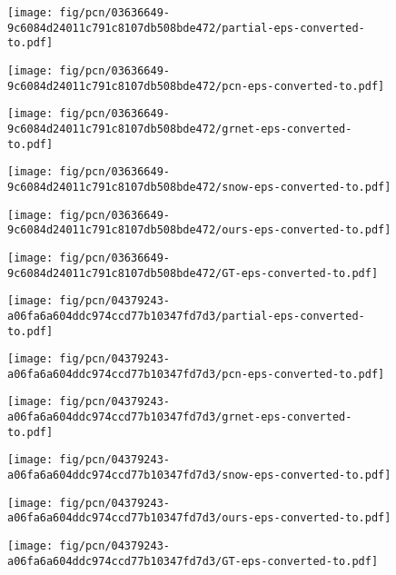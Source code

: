 \begin{figure*}[t]
	\begin{subfigure}{\sunit}
		\centering
		\texttt{[image: fig/pcn/03636649-9c6084d24011c791c8107db508bde472/partial-eps-converted-to.pdf]}
	\end{subfigure}\hfill \begin{subfigure}{\sunit}
		\centering
		\texttt{[image: fig/pcn/03636649-9c6084d24011c791c8107db508bde472/pcn-eps-converted-to.pdf]}
	\end{subfigure}\hfill \begin{subfigure}{\sunit}
		\centering
		\texttt{[image: fig/pcn/03636649-9c6084d24011c791c8107db508bde472/grnet-eps-converted-to.pdf]}
	\end{subfigure}\hfill \begin{subfigure}{\sunit}
		\centering
		\texttt{[image: fig/pcn/03636649-9c6084d24011c791c8107db508bde472/snow-eps-converted-to.pdf]}
	\end{subfigure}\hfill \begin{subfigure}{\sunit}
		\centering
		\texttt{[image: fig/pcn/03636649-9c6084d24011c791c8107db508bde472/ours-eps-converted-to.pdf]}
	\end{subfigure}\hfill \begin{subfigure}{\sunit}
		\centering
		\texttt{[image: fig/pcn/03636649-9c6084d24011c791c8107db508bde472/GT-eps-converted-to.pdf]}
	\end{subfigure}


	\vspace{5pt}
	
	\begin{subfigure}{\sunit}
		\centering
		\texttt{[image: fig/pcn/04379243-a06fa6a604ddc974ccd77b10347fd7d3/partial-eps-converted-to.pdf]}
	\end{subfigure}\hfill \begin{subfigure}{\sunit}
		\centering
		\texttt{[image: fig/pcn/04379243-a06fa6a604ddc974ccd77b10347fd7d3/pcn-eps-converted-to.pdf]}
	\end{subfigure}\hfill \begin{subfigure}{\sunit}
		\centering
		\texttt{[image: fig/pcn/04379243-a06fa6a604ddc974ccd77b10347fd7d3/grnet-eps-converted-to.pdf]}
	\end{subfigure}\hfill \begin{subfigure}{\sunit}
		\centering
		\texttt{[image: fig/pcn/04379243-a06fa6a604ddc974ccd77b10347fd7d3/snow-eps-converted-to.pdf]}
	\end{subfigure}\hfill \begin{subfigure}{\sunit}
		\centering
		\texttt{[image: fig/pcn/04379243-a06fa6a604ddc974ccd77b10347fd7d3/ours-eps-converted-to.pdf]}
	\end{subfigure}\hfill \begin{subfigure}{\sunit}
		\centering
		\texttt{[image: fig/pcn/04379243-a06fa6a604ddc974ccd77b10347fd7d3/GT-eps-converted-to.pdf]}
	\end{subfigure}


\end{figure*}
